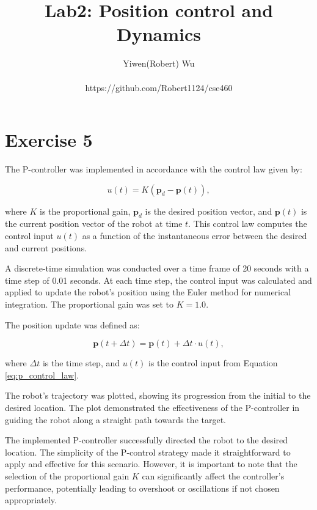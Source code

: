 \documentclass[letterpaper, 10 pt, conference]{ieeeconf}  %
\title{\LARGE \bf
Lab2: Position control and Dynamics
}
\author{Yiwen(Robert) Wu\\\\https://github.com/Robert1124/cse460}
\begin{document}
\maketitle
\thispagestyle{empty}
\pagestyle{empty}

\section{Exercise 5}

The P-controller was implemented in accordance with the control law given by:

\begin{equation}
    u(t) = K (\mathbf{p}_d - \mathbf{p}(t)),
    \label{eq:p_control_law}
\end{equation}

where \( K \) is the proportional gain, \( \mathbf{p}_d \) is the desired position vector, and \( \mathbf{p}(t) \) is the current position vector of the robot at time \( t \). This control law computes the control input \( u(t) \) as a function of the instantaneous error between the desired and current positions.

A discrete-time simulation was conducted over a time frame of 20 seconds with a time step of 0.01 seconds. At each time step, the control input was calculated and applied to update the robot's position using the Euler method for numerical integration. The proportional gain was set to \( K = 1.0 \).

The position update was defined as:

\begin{equation}
    \mathbf{p}(t + \Delta t) = \mathbf{p}(t) + \Delta t \cdot u(t),
    \label{eq:euler_integration}
\end{equation}

where \( \Delta t \) is the time step, and \( u(t) \) is the control input from Equation \ref{eq:p_control_law}.

The robot's trajectory was plotted, showing its progression from the initial to the desired location. The plot demonstrated the effectiveness of the P-controller in guiding the robot along a straight path towards the target.

The implemented P-controller successfully directed the robot to the desired location. The simplicity of the P-control strategy made it straightforward to apply and effective for this scenario. However, it is important to note that the selection of the proportional gain \( K \) can significantly affect the controller's performance, potentially leading to overshoot or oscillations if not chosen appropriately.
\end{document}
